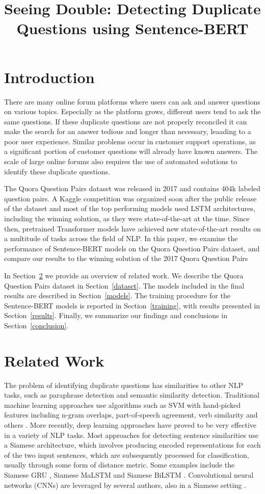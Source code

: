 \documentclass[10pt, a4paper]{article}
\title{Seeing Double: Detecting Duplicate Questions using Sentence-BERT}
\begin{document}
\maketitleabstract

\section{Introduction}

There are many online forum platforms where users can ask and answer questions on various topics.
Especially as the platform grows, different users tend to ask the same questions.
If these duplicate questions are not properly reconciled it can make the search for an answer tedious and longer than necessary, leaading to a poor user experience.
Similar problems occur in customer support operations, as a significant portion of customer questions will already have known answers.
The scale of large online forums also requires the use of automated solutions to identify these duplicate questions.

The Quora Question Pairs dataset was released in 2017 and contains 404k labeled question pairs.
A Kaggle competition was organized soon after the public release of the dataset and most of the top performing models used LSTM architectures, including the winning solution, as they were state-of-the-art at the time.
Since then, pretrained Transformer models have achieved new state-of-the-art results on a multitude of tasks across the field of NLP.
In this paper, we examine the performance of Sentence-BERT models on the Quora Question Pairs dataset, and compare our results to the winning solution of the 2017 Quora Question Pairs

In Section~\ref{related-work} we provide an overview of related work. 
We describe the Quora Question Pairs dataset in Section~\ref{dataset}.
The models included in the final results are described in Section~\ref{models}.
The training procedure for the Sentence-BERT models is reported in Section~\ref{training}, with results presented in Section~\ref{results}.
Finally, we summarize our findings and conclusions in Section~\ref{conclusion}.

\section{Related Work} \label{related-work}

The problem of identifying duplicate questions has similarities to other NLP tasks, such as paraphrase detection and semantic similarity detection.
Traditional machine learning approaches use algorithms such as SVM with hand-picked features including n-gram overlaps, part-of-speech agreement, verb similarity and others \citep{dey2016paraphrase}.
More recently, deep learning approaches have proved to be very effective in a variety of NLP tasks.
Most approaches for detecting sentence similarities use a Siamese architecture, which involves producing encoded representations for each of the two input sentences, which are subsequently processed for classification, usually through some form of distance metric.
Some examples include the Siamese GRU \citep{homma2016detecting}, Siamese MaLSTM \citep{imtiaz2020duplicate} and Siamese BiLSTM \citep{fradelos2023using}.
Convolutional neural networks (CNNs) are leveraged by several authors, also in a Siamese setting \citep{bogdanova2015detecting,prabowo2019duplicate}.
\end{document}
